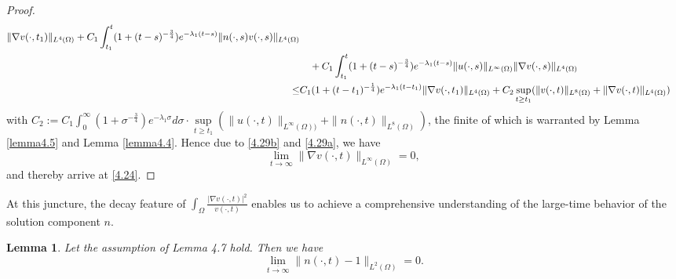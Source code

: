 \documentclass[12pt]{article}
\theoremstyle{plain}
\newtheorem{lemma}{Lemma}[section]
\theoremstyle{definition}
\numberwithin{equation}{section}
\begin{document}
\begin{proof}[Proof]
\begin{align}
\|\nabla v(\cdot,t_1)\|_{L^4(\Omega)}
+C_1\int_{t_1}^t(1+(t-s)^{-\frac 34})
e^{-\lambda_1(t-s)}\|n(\cdot,s)v(\cdot,s)\|_{L^4(\Omega)}\notag\\
&\quad+C_1\int_{t_1}^t(1+(t-s)^{-\frac3 4})
e^{-\lambda_1(t-s)}\|u(\cdot,s)\|_{L^\infty(\Omega)}
\|\nabla v(\cdot,s)\|_{L^4(\Omega)}\notag\\
\leq &
C_1(1+(t-t_1)^{-\frac14}) e^{-\lambda_1(t-t_1)}
\|\nabla v(\cdot,t_1)\|_{L^4(\Omega)}
+C_2 \sup\limits_{t\geq t_1}( \|v(\cdot,t)\|_{L^8(\Omega)}+\|\nabla v(\cdot,t)\|_{L^4(\Omega)})\notag
\end{align}
  with  $C_2:=C_1\int_0^\infty(1+\sigma^{-\frac34})
e^{-\lambda_1\sigma}d\sigma\cdot \sup\limits_{t\geq t_1} (\|u(\cdot,t)\|_{L^\infty(\Omega))}+ \|n(\cdot,t)\|_{L^8(\Omega)})$, the finite of which is warranted by  Lemma \ref{lemma4.5} and  Lemma \ref{lemma4.4}.
Hence due to \eqref{4.29b} and \eqref{4.29a}, we have
 \begin{equation}\label{4.29d}
\displaystyle\lim_{t\rightarrow \infty} \| \nabla v(\cdot,t)\|_{L^\infty(\Omega)} =0,
\end{equation}
and thereby arrive at  \eqref{4.24}.
\end{proof}

At this juncture, the decay feature of $\int_\Omega \frac {|\nabla v(\cdot,t)|^2}{v(\cdot,t)} $ enables us to achieve a comprehensive understanding of the large-time behavior of the solution component $n$.

\begin{lemma}\label{lemma4.9}
Let the assumption of Lemma 4.7 hold. Then  we have
 \begin{equation}\label{4.30}
\displaystyle\lim_{ \overline{t\rightarrow \infty}} \|n(\cdot,t)-1\|_{L^2(\Omega)}= 0.
\end{equation}
\end{lemma}
\end{document}

